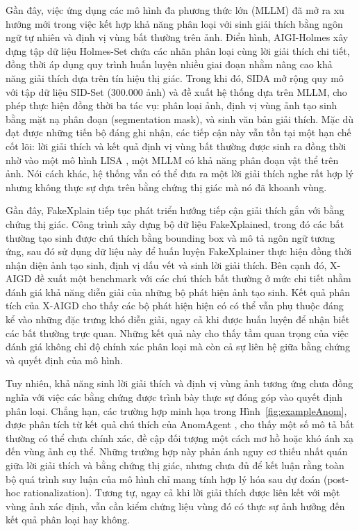 \documentclass[12pt]{report}
\begin{document}
Gần đây, việc ứng dụng các mô hình đa phương thức lớn (MLLM) đã mở ra xu hướng mới trong việc kết hợp khả năng phân loại với sinh giải thích bằng ngôn ngữ tự nhiên và định vị vùng bất thường trên ảnh. Điển hình, AIGI-Holmes \cite{zhou2025aigi} xây dựng tập dữ liệu Holmes-Set chứa các nhãn phân loại cùng lời giải thích chi tiết, đồng thời áp dụng quy trình huấn luyện nhiều giai đoạn nhằm nâng cao khả năng giải thích dựa trên tín hiệu thị giác. Trong khi đó, SIDA \cite{huang2025sida} mở rộng quy mô với tập dữ liệu SID-Set (300.000 ảnh) và đề xuất hệ thống dựa trên MLLM, cho phép thực hiện đồng thời ba tác vụ: phân loại ảnh, định vị vùng ảnh tạo sinh bằng mặt nạ phân đoạn (segmentation mask), và sinh văn bản giải thích. Mặc dù đạt được những tiến bộ đáng ghi nhận, các tiếp cận này vẫn tồn tại một hạn chế cốt lõi: lời giải thích và kết quả định vị vùng bất thường được sinh ra đồng thời nhờ vào một mô hình LISA \cite{lai2024lisa}, một MLLM có khả năng phân đoạn vật thể trên ảnh. Nói cách khác, hệ thống vẫn có thể đưa ra một lời giải thích nghe rất hợp lý nhưng không thực sự dựa trên bằng chứng thị giác mà nó đã khoanh vùng.

Gần đây, FakeXplain \cite{ji2026fakexplain} tiếp tục phát triển hướng tiếp cận giải thích gắn với bằng chứng thị giác. Công trình xây dựng bộ dữ liệu FakeXplained, trong đó các bất thường tạo sinh được chú thích bằng bounding box và mô tả ngôn ngữ tương ứng, sau đó sử dụng dữ liệu này để huấn luyện FakeXplainer thực hiện đồng thời nhận diện ảnh tạo sinh, định vị dấu vết và sinh lời giải thích. Bên cạnh đó, X-AIGD \cite{xiao2026xaigd} đề xuất một benchmark với các chú thích bất thường ở mức chi tiết nhằm đánh giá khả năng diễn giải của những bộ phát hiện ảnh tạo sinh. Kết quả phân tích của X-AIGD cho thấy các bộ phát hiện hiện có có thể vẫn phụ thuộc đáng kể vào những đặc trưng khó diễn giải, ngay cả khi được huấn luyện để nhận biết các bất thường trực quan. Những kết quả này cho thấy tầm quan trọng của việc đánh giá không chỉ độ chính xác phân loại mà còn cả sự liên hệ giữa bằng chứng và quyết định của mô hình.

Tuy nhiên, khả năng sinh lời giải thích và định vị vùng ảnh tương ứng chưa đồng nghĩa với việc các bằng chứng được trình bày thực sự đóng góp vào quyết định phân loại. Chẳng hạn, các trường hợp minh họa trong Hình~\ref{fig:exampleAnom}, được phân tích từ kết quả chú thích của AnomAgent \cite{tan2026semantic}, cho thấy một số mô tả bất thường có thể chưa chính xác, đề cập đối tượng một cách mơ hồ hoặc khó ánh xạ đến vùng ảnh cụ thể. Những trường hợp này phản ánh nguy cơ thiếu nhất quán giữa lời giải thích và bằng chứng thị giác, nhưng chưa đủ để kết luận rằng toàn bộ quá trình suy luận của mô hình chỉ mang tính hợp lý hóa sau dự đoán (post-hoc rationalization). Tương tự, ngay cả khi lời giải thích được liên kết với một vùng ảnh xác định, vẫn cần kiểm chứng liệu vùng đó có thực sự ảnh hưởng đến kết quả phân loại hay không.
\end{document}
